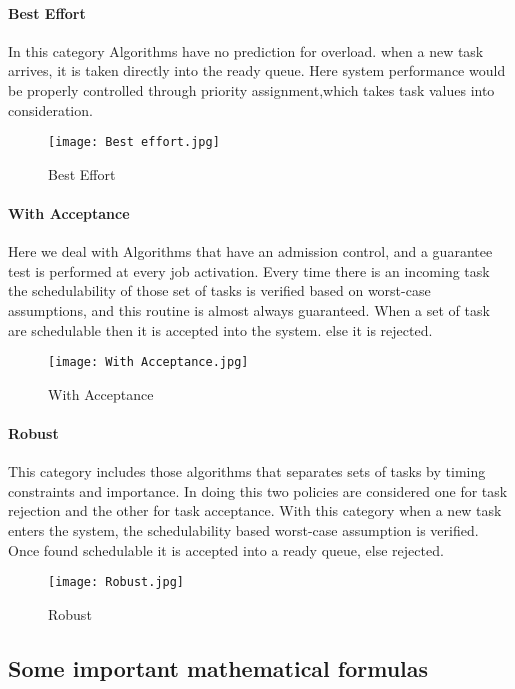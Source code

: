 \documentclass[conference]{IEEEtran}
\begin{document}
\paragraph{Best Effort}
In this category Algorithms have no prediction for overload. when a new task arrives, it is taken directly into the ready queue. Here system performance would be properly controlled through priority assignment,which takes task values into consideration.

\begin{figure}[htp]
    \centering
    \texttt{[image: Best effort.jpg]}
    \cite{buttazzo2011hard}
    \caption{Best Effort}
    \label{fig:reg-gen}
\end{figure}
\paragraph{With Acceptance}
Here we deal with Algorithms that have an admission control, and a guarantee test is performed at every job activation. Every time there is an incoming task the schedulability of those set of tasks is verified based on worst-case assumptions, and this routine is almost always guaranteed. When a set of task are schedulable then it is accepted into the system. else it is rejected.

\begin{figure}[htp]
    \centering
    \texttt{[image: With Acceptance.jpg]}
    \cite{buttazzo2011hard}
    \caption{With Acceptance}
    \label{fig:reg-gen}
\end{figure}

\paragraph{Robust}
This category includes those algorithms that separates sets of tasks by timing constraints and importance. In doing this two policies are considered one for task rejection and the other for task acceptance. With this category when a new task enters the system, the schedulability based worst-case assumption is verified. Once found schedulable it is accepted into a ready queue, else rejected.

\begin{figure}[htp]
    \centering
    \texttt{[image: Robust.jpg]}
    \cite{buttazzo2011hard}
    \caption{Robust}
    \label{fig:reg-gen}
\end{figure}


\subsection{Some important mathematical formulas}
\end{document}
